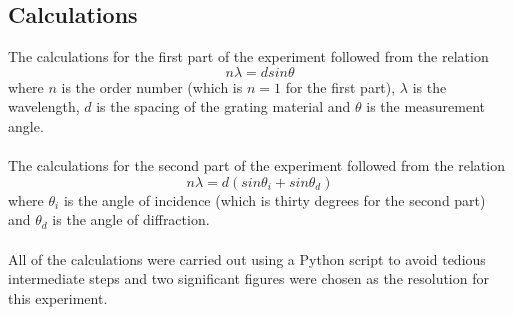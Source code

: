 	\subsection{Calculations}
		The calculations for the first part of the experiment followed from the relation
		\begin{equation}
			n \lambda = d sin\theta
		\end{equation}
		where $n$ is the order number (which is $n = 1$ for the first part), $\lambda$ is the wavelength, $d$ is the spacing of the grating material and $\theta$ is the measurement angle.
		\\
		\\
		The calculations for the second part of the experiment followed from the relation
		\begin{equation}
			n \lambda = d (sin\theta_i + sin\theta_d)
		\end{equation}
		where $\theta_i$ is the angle of incidence (which is thirty degrees for the second part) and $\theta_d$ is the angle of diffraction.
		\\
		\\
		All of the calculations were carried out using a Python script to avoid tedious intermediate steps and two significant figures were chosen as the resolution for this experiment.